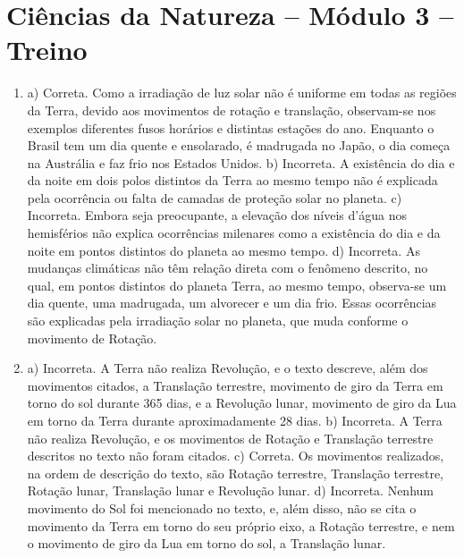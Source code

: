 \section*{Ciências da Natureza -- Módulo 3 -- Treino}

\begin{enumerate}
\item
a) Correta. Como a irradiação de luz solar não é uniforme em todas as
regiões da Terra, devido aos movimentos de rotação e translação,
observam-se nos exemplos diferentes fusos horários e distintas estações do
ano. Enquanto o Brasil tem um dia quente e ensolarado, é madrugada 
no Japão, o dia começa na Austrália e faz frio nos Estados Unidos.
b) Incorreta. A existência do dia e da noite em dois polos distintos da
Terra ao mesmo tempo não é explicada pela ocorrência ou falta de camadas
de proteção solar no planeta.
c) Incorreta. Embora seja preocupante, a elevação dos níveis d'água nos
hemisférios não explica ocorrências milenares como a existência do dia
e da noite em pontos distintos do planeta ao mesmo tempo.
d) Incorreta. As mudanças climáticas não têm relação direta com o
fenômeno descrito, no qual, em pontos distintos do planeta Terra, ao mesmo
tempo, observa-se um dia quente, uma madrugada, um alvorecer e um dia
frio. Essas ocorrências são explicadas pela irradiação solar no planeta,
que muda conforme o movimento de Rotação.

\item
a) Incorreta. A Terra não realiza Revolução, e o texto descreve, além
dos movimentos citados, a Translação terrestre, movimento de giro da
Terra em torno do sol durante 365 dias, e a Revolução lunar, movimento
de giro da Lua em torno da Terra durante aproximadamente 28 dias.
b) Incorreta. A Terra não realiza Revolução, e os movimentos de Rotação
e Translação terrestre descritos no texto não foram citados.
c) Correta. Os movimentos realizados, na ordem de descrição do texto,
são Rotação terrestre, Translação terrestre, Rotação lunar, Translação
lunar e Revolução lunar.
d) Incorreta. Nenhum movimento do Sol foi mencionado no texto, e, além
disso, não se cita o movimento da Terra em torno do seu próprio eixo, a
Rotação terrestre, e nem o movimento de giro da Lua em torno do sol, a
Translação lunar.


\end{enumerate}
